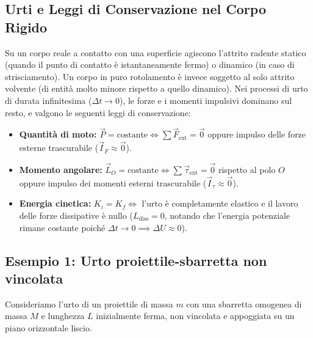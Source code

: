 \subsection{Urti e Leggi di Conservazione nel Corpo Rigido}
Su un corpo reale a contatto con una superficie agiscono l'attrito radente statico (quando il punto di contatto è istantaneamente fermo) o dinamico (in caso di strisciamento). Un corpo in puro rotolamento è invece soggetto al solo attrito volvente (di entità molto minore rispetto a quello dinamico). 
Nei processi di urto di durata infinitesima ($\Delta t \to 0$), le forze e i momenti impulsivi dominano sul resto, e valgono le seguenti leggi di conservazione:
\begin{itemize}
    \item \textbf{Quantità di moto:} $\vec{P} = \text{costante} \iff \sum \vec{F}_{\text{ext}} = \vec{0}$ oppure impulso delle forze esterne trascurabile ($\vec{I}_{F} \approx \vec{0}$).
    \item \textbf{Momento angolare:} $\vec{L}_O = \text{costante} \iff \sum \vec{\tau}_{\text{ext}} = \vec{0}$ rispetto al polo $O$ oppure impulso dei momenti esterni trascurabile ($\vec{I}_{\tau} \approx \vec{0}$).
    \item \textbf{Energia cinetica:} $K_i = K_f \iff$ l'urto è completamente elastico e il lavoro delle forze dissipative è nullo ($L_{\text{diss}} = 0$, notando che l'energia potenziale rimane costante poiché $\Delta t \to 0 \implies \Delta U \approx 0$).
\end{itemize}

\subsection{Esempio 1: Urto proiettile-sbarretta non vincolata}
Consideriamo l'urto di un proiettile di massa $m$ con una sbarretta omogenea di massa $M$ e lunghezza $L$ inizialmente ferma, non vincolata e appoggiata su un piano orizzontale liscio.

